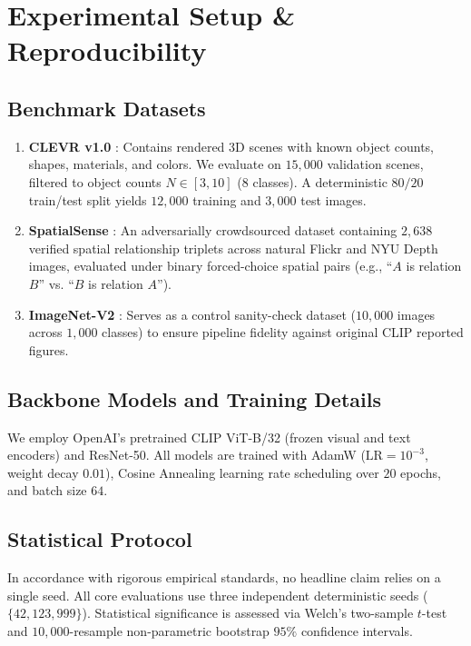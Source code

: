 \documentclass[conference]{IEEEtran}
\begin{document}
\section{Experimental Setup \& Reproducibility}
\label{sec:setup}

\subsection{Benchmark Datasets}
\begin{enumerate}
    \item \textbf{CLEVR v1.0} \cite{johnson2017clevr}: Contains rendered 3D scenes with known object counts, shapes, materials, and colors. We evaluate on $15,000$ validation scenes, filtered to object counts $N \in [3, 10]$ ($8$ classes). A deterministic $80/20$ train/test split yields $12,000$ training and $3,000$ test images.
    \item \textbf{SpatialSense} \cite{yang2019spatialsense}: An adversarially crowdsourced dataset containing $2,638$ verified spatial relationship triplets across natural Flickr and NYU Depth images, evaluated under binary forced-choice spatial pairs (e.g., ``$A$ is relation $B$'' vs. ``$B$ is relation $A$'').
    \item \textbf{ImageNet-V2} \cite{recht2019imagenet}: Serves as a control sanity-check dataset ($10,000$ images across $1,000$ classes) to ensure pipeline fidelity against original CLIP reported figures.
\end{enumerate}

\subsection{Backbone Models and Training Details}
We employ OpenAI's pretrained CLIP ViT-B/32 (frozen visual and text encoders) and ResNet-50. All models are trained with AdamW ($\text{LR}=10^{-3}$, weight decay $0.01$), Cosine Annealing learning rate scheduling over $20$ epochs, and batch size $64$. 

\subsection{Statistical Protocol}
In accordance with rigorous empirical standards, no headline claim relies on a single seed. All core evaluations use three independent deterministic seeds ($\{42, 123, 999\}$). Statistical significance is assessed via Welch's two-sample $t$-test and $10,000$-resample non-parametric bootstrap $95\%$ confidence intervals.
\end{document}
